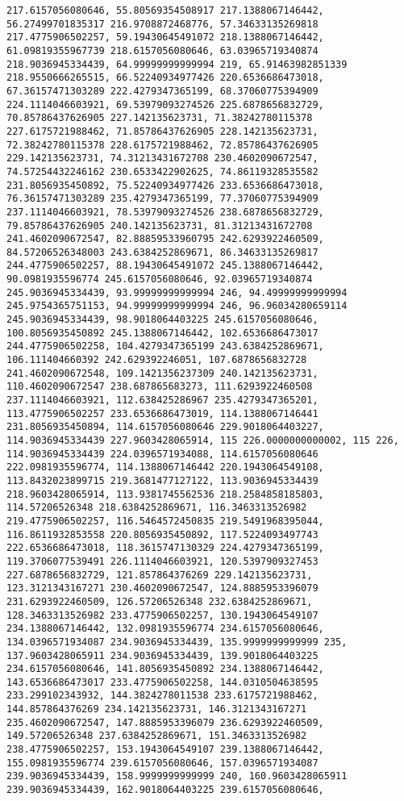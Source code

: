 \documentclass{article}
\begin{document}
\begin{Verbatim}[commandchars=\\\{\}]
217.6157056080646, 55.80569354508917 217.1388067146442, 56.27499701835317 216.9708872468776, 57.34633135269818 217.4775906502257, 59.19430645491072 218.1388067146442, 61.09819355967739 218.6157056080646, 63.03965719340874 218.9036945334439, 64.99999999999994 219, 65.91463982851339 218.9550666265515, 66.52240934977426 220.6536686473018, 67.36157471303289 222.4279347365199, 68.37060775394909 224.1114046603921, 69.53979093274526 225.6878656832729, 70.85786437626905 227.142135623731, 71.38242780115378 227.6175721988462, 71.85786437626905 228.142135623731, 72.38242780115378 228.6175721988462, 72.85786437626905 229.142135623731, 74.31213431672708 230.4602090672547, 74.57254432246162 230.6533422902625, 74.86119328535582 231.8056935450892, 75.52240934977426 233.6536686473018, 76.36157471303289 235.4279347365199, 77.37060775394909 237.1114046603921, 78.53979093274526 238.6878656832729, 79.85786437626905 240.142135623731, 81.31213431672708 241.4602090672547, 82.88859533960795 242.6293922460509, 84.57206526348003 243.6384252869671, 86.34633135269817 244.4775906502257, 88.19430645491072 245.1388067146442, 90.0981935596774 245.6157056080646, 92.03965719340874 245.9036945334439, 93.99999999999994 246, 94.49999999999994 245.9754365751153, 94.99999999999994 246, 96.96034280659114 245.9036945334439, 98.9018064403225 245.6157056080646, 100.8056935450892 245.1388067146442, 102.6536686473017 244.4775906502258, 104.4279347365199 243.6384252869671, 106.111404660392 242.629392246051, 107.6878656832728 241.4602090672548, 109.1421356237309 240.142135623731, 110.4602090672547 238.687865683273, 111.6293922460508 237.1114046603921, 112.638425286967 235.4279347365201, 113.4775906502257 233.6536686473019, 114.1388067146441 231.8056935450894, 114.6157056080646 229.9018064403227, 114.9036945334439 227.9603428065914, 115 226.0000000000002, 115 226, 114.9036945334439 224.0396571934088, 114.6157056080646 222.0981935596774, 114.1388067146442 220.1943064549108, 113.8432023899715 219.3681477127122, 113.9036945334439 218.9603428065914, 113.9381745562536 218.2584858185803, 114.57206526348 218.6384252869671, 116.3463313526982 219.4775906502257, 116.5464572450835 219.5491968395044, 116.8611932853558 220.8056935450892, 117.5224093497743 222.6536686473018, 118.3615747130329 224.4279347365199, 119.3706077539491 226.1114046603921, 120.5397909327453 227.6878656832729, 121.857864376269 229.142135623731, 123.3121343167271 230.4602090672547, 124.8885953396079 231.6293922460509, 126.57206526348 232.6384252869671, 128.3463313526982 233.4775906502257, 130.1943064549107 234.1388067146442, 132.0981935596774 234.6157056080646, 134.0396571934087 234.9036945334439, 135.9999999999999 235, 137.9603428065911 234.9036945334439, 139.9018064403225 234.6157056080646, 141.8056935450892 234.1388067146442, 143.6536686473017 233.4775906502258, 144.0310504638595 233.299102343932, 144.3824278011538 233.6175721988462, 144.857864376269 234.142135623731, 146.3121343167271 235.4602090672547, 147.8885953396079 236.6293922460509, 149.57206526348 237.6384252869671, 151.3463313526982 238.4775906502257, 153.1943064549107 239.1388067146442, 155.0981935596774 239.6157056080646, 157.0396571934087 239.9036945334439, 158.9999999999999 240, 160.9603428065911 239.9036945334439, 162.9018064403225 239.6157056080646, 
\end{Verbatim}
\end{document}

